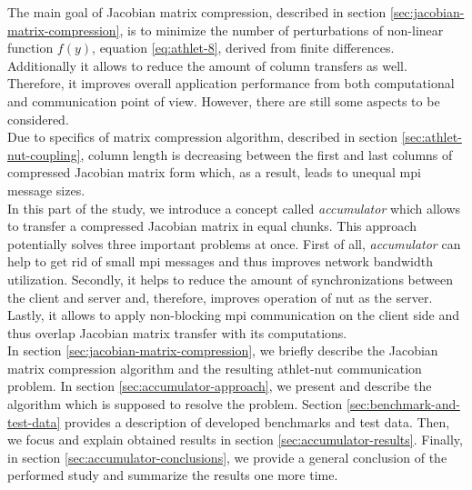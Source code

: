 The main goal of Jacobian matrix compression, described in section \ref{sec:jacobian-matrix-compression}, is to minimize the number of perturbations of non-linear function $f(y)$, equation \ref{eq:athlet-8}, derived from finite differences. Additionally it allows to reduce the amount of column transfers as well. Therefore, it improves overall application performance from both computational and communication point of view. However, there are still some aspects to be considered.\\


Due to specifics of matrix compression algorithm, described in section \ref{sec:athlet-nut-coupling}, column length is decreasing between the first and last columns of compressed Jacobian matrix form which, as a result, leads to unequal \acrshort{mpi} message sizes.\\


In this part of the study, we introduce a concept called \textit{accumulator} which allows to transfer a compressed Jacobian matrix in equal chunks. This approach potentially solves three important problems at once. First of all, \textit{accumulator} can help to get rid of small \acrshort{mpi} messages and thus improves network bandwidth utilization. Secondly, it helps to reduce the amount of synchronizations between the client and server and, therefore, improves operation of \acrshort{nut} as the server. Lastly, it allows to apply non-blocking \acrshort{mpi} communication on the client side and thus overlap Jacobian matrix transfer with its computations.\\


In section \ref{sec:jacobian-matrix-compression}, we briefly describe the Jacobian matrix compression algorithm and the resulting \acrshort{athlet}-\acrshort{nut} communication problem. In section \ref{sec:accumulator-approach}, we present and describe the algorithm which is supposed to resolve the problem. Section \ref{sec:benchmark-and-test-data} provides a description of developed benchmarks and test data. Then, we focus and explain obtained results in section \ref{sec:accumulator-results}. Finally, in section \ref{sec:accumulator-conclusions}, we provide a general conclusion of the performed study and summarize the results one more time.\\
